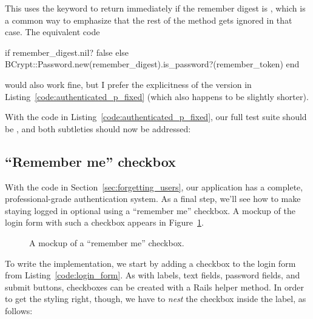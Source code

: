 \noindent This uses the  keyword to return immediately if the remember digest is , which is a common way to emphasize that the rest of the method gets ignored in that case. The equivalent code

\begin{code}
if remember_digest.nil?
  false
else
  BCrypt::Password.new(remember_digest).is_password?(remember_token)
end
\end{code}

\noindent would also work fine, but I prefer the explicitness of the version in Listing~\ref{code:authenticated_p_fixed} (which also happens to be slightly shorter).

With the code in Listing~\ref{code:authenticated_p_fixed}, our full test suite should be \passing, and both subtleties should now be addressed:

\begin{codelisting}
\codecaption{\passing}
\end{codelisting}


\subsection{``Remember me'' checkbox} %
\label{sec:remember_me_checkbox}

With the code in Section~\ref{sec:forgetting_users}, our application has a complete, professional-grade authentication system. As a final step, we'll see how to make staying logged in optional using a ``remember me'' checkbox. A mockup of the login form with such a checkbox appears in Figure~\ref{fig:login_remember_me_mockup}.

\begin{figure}
\begin{center}
\end{center}
\caption{A mockup of a ``remember me'' checkbox.\label{fig:login_remember_me_mockup}}
\end{figure}

To write the implementation, we start by adding a checkbox to the login form from Listing~\ref{code:login_form}. As with labels, text fields, password fields, and submit buttons, checkboxes can be created with a Rails helper method. In order to get the styling right, though, we have to \emph{nest} the checkbox inside the label, as follows:

